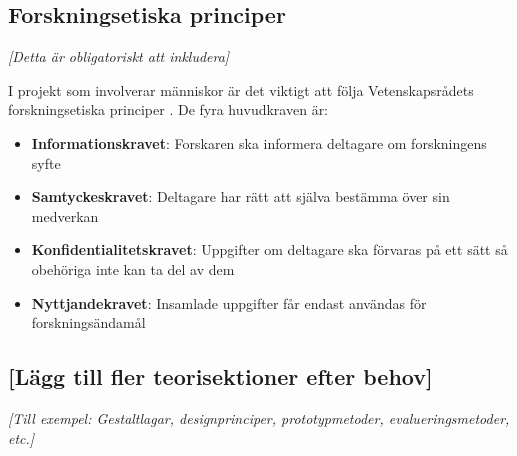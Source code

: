 \subsection{Forskningsetiska principer}

\textit{[Detta är obligatoriskt att inkludera]}

I projekt som involverar människor är det viktigt att följa Vetenskapsrådets forskningsetiska principer \cite{vetenskapsradet2002}. De fyra huvudkraven är:

\begin{itemize}
    \item \textbf{Informationskravet}: Forskaren ska informera deltagare om forskningens syfte
    \item \textbf{Samtyckeskravet}: Deltagare har rätt att själva bestämma över sin medverkan
    \item \textbf{Konfidentialitetskravet}: Uppgifter om deltagare ska förvaras på ett sätt så obehöriga inte kan ta del av dem
    \item \textbf{Nyttjandekravet}: Insamlade uppgifter får endast användas för forskningsändamål
\end{itemize}


\subsection{[Lägg till fler teorisektioner efter behov]}

\textit{[Till exempel: Gestaltlagar, designprinciper, prototypmetoder, evalueringsmetoder, etc.]}
